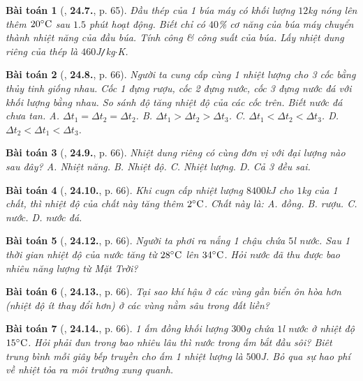 \documentclass{article}
\numberwithin{equation}{section}
\newtheorem{baitoan}{Bài toán}
\begin{document}
\begin{baitoan}[\cite{SBT_Vat_Ly_8}, \textbf{24.7.}, p. 65]
	Đầu thép của 1 búa máy có khối lượng $12$\emph{kg} nóng lên thêm $20^\circ{\rm C}$ sau $1.5$ phút hoạt động. Biết chỉ có $40$\% cơ năng của búa máy chuyển thành nhiệt năng của đầu búa. Tính công \& công suất của búa. Lấy nhiệt dung riêng của thép là $460$\emph{J\texttt{/}kg$\cdot$K}.
\end{baitoan}

\begin{baitoan}[\cite{SBT_Vat_Ly_8}, \textbf{24.8.}, p. 66]
	Người ta cung cấp cùng 1 nhiệt lượng cho 3 cốc bằng thủy tinh giống nhau. Cốc 1 đựng rượu, cốc 2 đựng nước, cốc 3 đựng nước đá với khối lượng bằng nhau. So sánh độ tăng nhiệt độ của các cốc trên. Biết nước đá chưa tan. {\sf A.} $\Delta t_1 = \Delta t_2 = \Delta t_2$. {\sf B.} $\Delta t_1 > \Delta t_2 > \Delta t_3$. {\sf C.} $\Delta t_1 < \Delta t_2 < \Delta t_3$. {\sf D.} $\Delta t_2 < \Delta t_1 < \Delta t_3$.
\end{baitoan}

\begin{baitoan}[\cite{SBT_Vat_Ly_8}, \textbf{24.9.}, p. 66]
	Nhiệt dung riêng có cùng đơn vị với đại lượng nào sau đây? {\sf A.} Nhiệt năng. {\sf B.} Nhiệt độ. {\sf C.} Nhiệt lượng. {\sf D.} Cả 3 đều sai.
\end{baitoan}

\begin{baitoan}[\cite{SBT_Vat_Ly_8}, \textbf{24.10.}, p. 66]
	Khi cugn cấp nhiệt lượng $8400$\emph{kJ} cho $1$\emph{kg} của 1 chất, thì nhiệt độ của chất này tăng thêm $2^\circ{\rm C}$. Chất này là: {\sf A.} đồng. {\sf B.} rượu. {\sf C.} nước. {\sf D.} nước đá.
\end{baitoan}

\begin{baitoan}[\cite{SBT_Vat_Ly_8}, \textbf{24.12.}, p. 66]
	Người ta phơi ra nắng 1 chậu chứa $5$\emph{l} nước. Sau 1 thời gian nhiệt độ của nước tăng từ $28^\circ{\rm C}$ lên $34^\circ{\rm C}$. Hỏi nước đã thu được bao nhiêu năng lượng từ Mặt Trời?
\end{baitoan}

\begin{baitoan}[\cite{SBT_Vat_Ly_8}, \textbf{24.13.}, p. 66]
	Tại sao khí hậu ở các vùng gần biển ôn hòa hơn (nhiệt độ ít thay đổi hơn) ở các vùng nằm sâu trong đất liền?
\end{baitoan}

\begin{baitoan}[\cite{SBT_Vat_Ly_8}, \textbf{24.14.}, p. 66]
	1 ấm đồng khối lượng $300$\emph{g} chứa $1$\emph{l} nước ở nhiệt độ $15^\circ{\rm C}$. Hỏi phải đun trong bao nhiêu lâu thì nước trong ấm bắt đầu sôi? Biêt trung bình mỗi giây bếp truyền cho ấm 1 nhiệt lượng là $500$\emph{J}. Bỏ qua sự hao phí về nhiệt tỏa ra môi trường xung quanh.
\end{baitoan}
\end{document}

